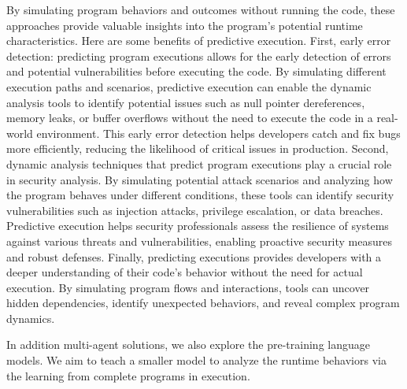 By simulating program behaviors and outcomes without running the code,
these approaches provide valuable insights into the program's
potential runtime characteristics. Here are some benefits of
predictive execution. First, early error detection: predicting program
executions allows for the early detection of errors and potential
vulnerabilities before executing the code. By simulating different
execution paths and scenarios, predictive execution can enable the
dynamic analysis tools to identify potential issues such as null
pointer dereferences, memory leaks, or buffer overflows without the
need to execute the code in a real-world environment. This early error
detection helps developers catch and fix bugs more efficiently,
reducing the likelihood of critical issues in production. Second,
dynamic analysis techniques that predict program executions play a
crucial role in security analysis. By simulating potential attack
scenarios and analyzing how the program behaves under different
conditions, these tools can identify security vulnerabilities such as
injection attacks, privilege escalation, or data breaches. Predictive
execution helps security professionals assess the resilience
of systems against various threats and vulnerabilities,
enabling proactive security measures and robust defenses. Finally,
predicting executions provides developers with a deeper understanding
of their code's behavior without the need for actual execution. By
simulating program flows and interactions, tools can uncover hidden
dependencies, identify unexpected behaviors, and reveal complex
program dynamics.


In addition multi-agent solutions, we also explore the
pre-training language models. We aim to teach a smaller model to analyze
the runtime behaviors via the learning from complete programs in execution.



